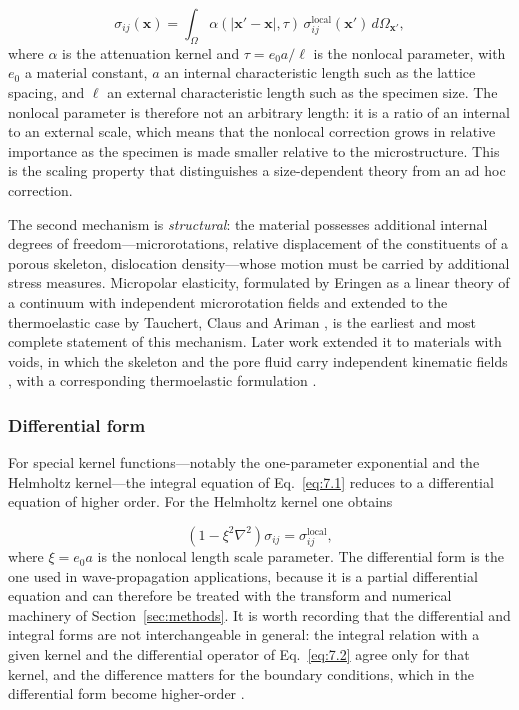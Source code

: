 \begin{equation}
\sigma_{ij}(\bm{x}) = \int_\Omega \alpha(|\bm{x}' - \bm{x}|, \tau)\, \sigma_{ij}^{\mathrm{local}}(\bm{x}')\, d\Omega_{\bm{x}'},
\label{eq:7.1}
\end{equation}
where $\alpha$ is the attenuation kernel and $\tau = e_0 a/\ell$ is the nonlocal parameter, with $e_0$ a material constant, $a$ an internal characteristic length such as the lattice spacing, and $\ell$ an external characteristic length such as the specimen size. The nonlocal parameter is therefore not an arbitrary length: it is a ratio of an internal to an external scale, which means that the nonlocal correction grows in relative importance as the specimen is made smaller relative to the microstructure. This is the scaling property that distinguishes a size-dependent theory from an ad hoc correction.

The second mechanism is \emph{structural}: the material possesses additional internal degrees of freedom---microrotations, relative displacement of the constituents of a porous skeleton, dislocation density---whose motion must be carried by additional stress measures. Micropolar elasticity, formulated by Eringen as a linear theory of a continuum with independent microrotation fields \cite{Eringen1966a} and extended to the thermoelastic case by Tauchert, Claus and Ariman \cite{Eringen1968b}, is the earliest and most complete statement of this mechanism. Later work extended it to materials with voids, in which the skeleton and the pore fluid carry independent kinematic fields \cite{Nunziato1979,Cowin1983}, with a corresponding thermoelastic formulation \cite{Iesan1986}.

\subsubsection{Differential form}

For special kernel functions---notably the one-parameter exponential and the Helmholtz kernel---the integral equation of Eq.~\eqref{eq:7.1} reduces to a differential equation of higher order. For the Helmholtz kernel one obtains

\begin{equation}
(1 - \xi^2\nabla^2)\sigma_{ij} = \sigma_{ij}^{\mathrm{local}},
\label{eq:7.2}
\end{equation}
where $\xi = e_0 a$ is the nonlocal length scale parameter. The differential form is the one used in wave-propagation applications, because it is a partial differential equation and can therefore be treated with the transform and numerical machinery of Section~\ref{sec:methods}. It is worth recording that the differential and integral forms are not interchangeable in general: the integral relation with a given kernel and the differential operator of Eq.~\eqref{eq:7.2} agree only for that kernel, and the difference matters for the boundary conditions, which in the differential form become higher-order \cite{Polizzotto2001}.

